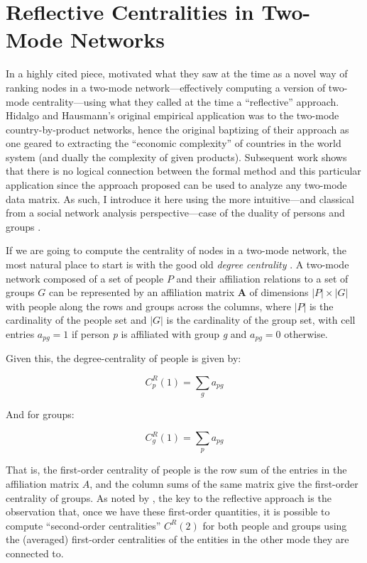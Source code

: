 \documentclass[a4paper,fleqn]{cas-sc}
\begin{document}
\section{Reflective Centralities in Two-Mode Networks} \label{sec:ref2mode}
In a highly cited piece, \citet{hidalgo2009building} motivated what they saw at the time as a novel way of ranking nodes in a two-mode network---effectively computing a version of two-mode centrality---using what they called at the time a ``reflective'' approach. Hidalgo and Hausmann's original empirical application was to the two-mode country-by-product networks, hence the original baptizing of their approach as one geared to extracting the ``economic complexity'' of countries in the world system (and dually the complexity of given products). Subsequent work shows that there is no logical connection between the formal method and this particular application since the approach proposed can be used to analyze any two-mode data matrix. As such, I introduce it here using the more intuitive---and classical from a social network analysis perspective---case of the duality of persons and groups \citep{breiger1974duality}. 

If we are going to compute the centrality of nodes in a two-mode network, the most natural place to start is with the good old \textit{degree centrality} \citep{faust1997centrality}. A two-mode network composed of a set of people $P$ and their affiliation relations to a set of groups $G$ can be represented by an affiliation matrix $\mathbf{A}$ of dimensions $|P| \times |G|$ with people along the rows and groups across the columns, where $|P|$ is the cardinality of the people set and $|G|$ is the cardinality of the group set, with cell entries $a_{pg}= 1$ if person \textit{p} is affiliated with group \textit{g} and $a_{pg}= 0$ otherwise. 

Given this, the degree-centrality of people is given by:

\begin{equation}
    C^R_p(1) = \sum_g a_{pg}
    \label{eq:R1_p}
\end{equation}

And for groups:

\begin{equation}
   C^R_g(1) = \sum_p a_{pg}
  \label{eq:R1_g}
\end{equation}

That is, the first-order centrality of people is the row sum of the entries in the affiliation matrix $A$, and the column sums of the same matrix give the first-order centrality of groups. As noted by \citet{hidalgo2009building}, the key to the reflective approach is the observation that, once we have these first-order quantities, it is possible to compute ``second-order centralities'' $C^R(2)$ for both people and groups using the (averaged) first-order centralities of the entities in the other mode they are connected to. 
\end{document}

